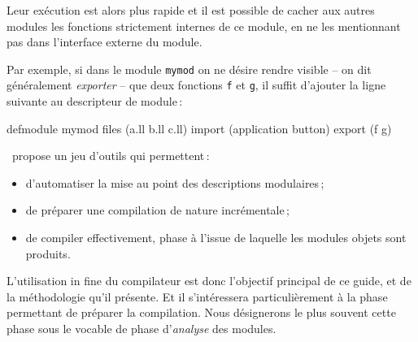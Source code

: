 Leur ex\'{e}cution est alors plus rapide et il est possible de cacher
aux autres modules les fonctions strictement internes de ce
module, en ne les mentionnant pas dans l'interface externe du module.

Par exemple, si dans le module {\tt mymod} on ne d\'{e}sire rendre
visible -- on dit g\'{e}n\'{e}ralement {\em exporter} --
que deux fonctions {\tt f} et {\tt g}, il suffit d'ajouter la
ligne suivante au descripteur de module\,:

\begin{Code*}
defmodule mymod
files (a.ll b.ll c.ll)
import (application button)
export (f g)
\end{Code*}




\LeLisp\ propose un jeu d'outils qui permettent\,:
\begin{itemize}
\item d'automatiser la mise au point des 
descriptions modulaires\,;
\item de pr\'{e}parer
une compilation de nature incr\'{e}mentale\,;
\item de compiler effectivement, phase \`{a} l'issue
de laquelle les modules objets sont produits.
\end{itemize}
L'utilisation in fine du compilateur est donc l'objectif
principal de ce guide, et de la m\'{e}thodologie qu'il pr\'{e}sente.
Et il s'int\'{e}ressera particuli\`{e}rement
\`{a} la phase permettant de pr\'{e}parer la 
compilation. Nous d\'{e}signerons le plus souvent cette phase
sous le vocable de phase d'{\em analyse} des modules.


